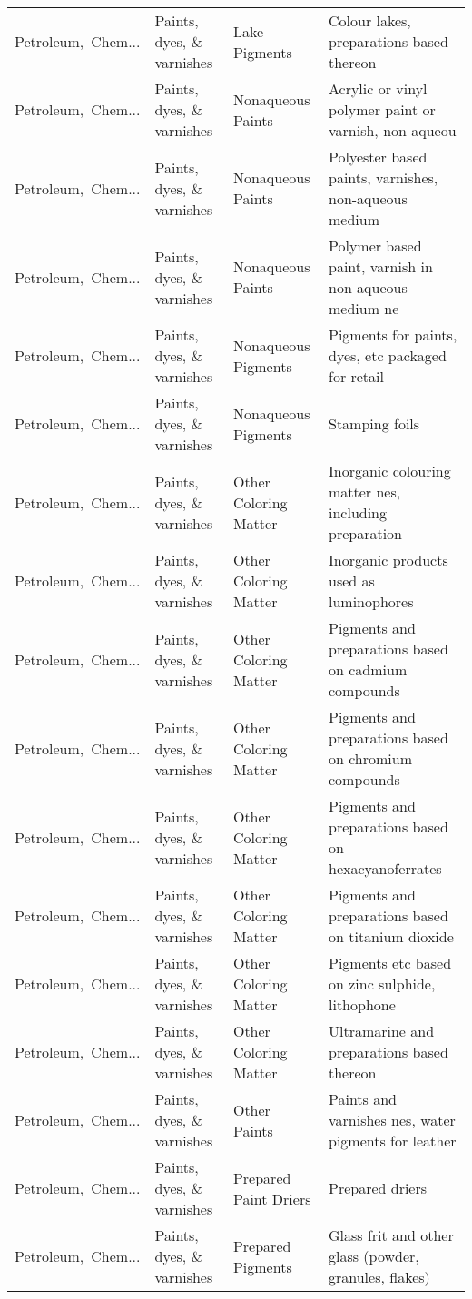 \begin{appendices}
\begin{xltabular}{\textwidth}{|p{0.10\textwidth}|p{0.25\textwidth}|p{0.24\textwidth}|p{0.31\textwidth}|}
Petroleum,\ Chem... & Paints, dyes, \& varnishes & Lake Pigments & Colour lakes, preparations based thereon \\
Petroleum,\ Chem... & Paints, dyes, \& varnishes & Nonaqueous Paints & Acrylic or vinyl polymer paint or varnish, non-aqueou \\
Petroleum,\ Chem... & Paints, dyes, \& varnishes & Nonaqueous Paints & Polyester based paints, varnishes, non-aqueous medium \\
Petroleum,\ Chem... & Paints, dyes, \& varnishes & Nonaqueous Paints & Polymer based paint, varnish in non-aqueous medium ne \\
Petroleum,\ Chem... & Paints, dyes, \& varnishes & Nonaqueous Pigments & Pigments for paints, dyes, etc packaged for retail \\
Petroleum,\ Chem... & Paints, dyes, \& varnishes & Nonaqueous Pigments & Stamping foils \\
Petroleum,\ Chem... & Paints, dyes, \& varnishes & Other Coloring Matter & Inorganic colouring matter nes, including preparation \\
Petroleum,\ Chem... & Paints, dyes, \& varnishes & Other Coloring Matter & Inorganic products used as luminophores \\
Petroleum,\ Chem... & Paints, dyes, \& varnishes & Other Coloring Matter & Pigments and preparations based on cadmium compounds \\
Petroleum,\ Chem... & Paints, dyes, \& varnishes & Other Coloring Matter & Pigments and preparations based on chromium compounds \\
Petroleum,\ Chem... & Paints, dyes, \& varnishes & Other Coloring Matter & Pigments and preparations based on hexacyanoferrates \\
Petroleum,\ Chem... & Paints, dyes, \& varnishes & Other Coloring Matter & Pigments and preparations based on titanium dioxide \\
Petroleum,\ Chem... & Paints, dyes, \& varnishes & Other Coloring Matter & Pigments etc based on zinc sulphide, lithophone \\
Petroleum,\ Chem... & Paints, dyes, \& varnishes & Other Coloring Matter & Ultramarine and preparations based thereon \\
Petroleum,\ Chem... & Paints, dyes, \& varnishes & Other Paints & Paints and varnishes nes, water pigments for leather \\
Petroleum,\ Chem... & Paints, dyes, \& varnishes & Prepared Paint Driers & Prepared driers \\
Petroleum,\ Chem... & Paints, dyes, \& varnishes & Prepared Pigments & Glass frit and other glass (powder, granules, flakes) \\

\end{xltabular}
\end{appendices}
